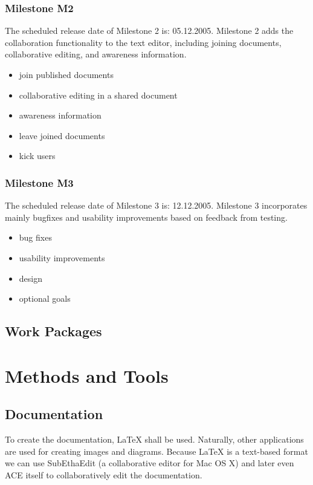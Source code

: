 \documentclass[11pt,a4paper]{article}
\begin{document}
\subsubsection{Milestone M2}

The scheduled release date of Milestone 2 is: 05.12.2005. Milestone 2 adds the collaboration functionality
to the text editor, including joining documents, collaborative editing, and awareness information.

\begin{itemize}
 \item join published documents
 \item collaborative editing in a shared document
 \item awareness information
 \item leave joined documents
 \item kick users
\end{itemize}

\subsubsection{Milestone M3}

The scheduled release date of Milestone 3 is: 12.12.2005. Milestone 3 incorporates mainly bugfixes and
usability improvements based on feedback from testing.

\begin{itemize}
 \item bug fixes
 \item usability improvements
 \item design
 \item optional goals
\end{itemize}

\subsection{Work Packages}


%
%
%
%
%
%
%
%
%
%


\section{Methods and Tools}

\subsection{Documentation}
To create the documentation, \LaTeX{} shall be used. Naturally, other applications are used for creating images and diagrams.
Because \LaTeX{} is a text-based format we can use SubEthaEdit (a collaborative editor for Mac OS X) and later even
ACE itself to collaboratively edit the documentation. 
\end{document}
